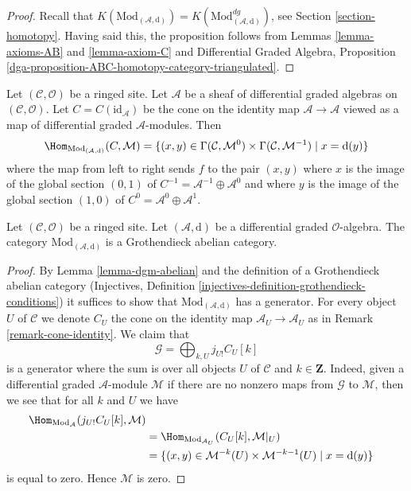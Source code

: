 \begin{proof}
Recall that $K(\text{Mod}_{(\mathcal{A}, \text{d})}) =
K(\text{Mod}^{dg}_{(\mathcal{A}, \text{d})})$, see
Section \ref{section-homotopy}.
Having said this, the proposition
follows from Lemmas \ref{lemma-axioms-AB} and \ref{lemma-axiom-C}
and
Differential Graded Algebra, Proposition
\ref{dga-proposition-ABC-homotopy-category-triangulated}.
\end{proof}

\begin{remark}
\label{remark-cone-identity}
Let $(\mathcal{C}, \mathcal{O})$ be a ringed site.
Let $\mathcal{A}$ be a sheaf of differential graded algebras
on $(\mathcal{C}, \mathcal{O})$. Let $C = C(\text{id}_\mathcal{A})$
be the cone on the identity map $\mathcal{A} \to \mathcal{A}$ viewed
as a map of differential graded $\mathcal{A}$-modules.
Then
$$
\Hom_{\text{Mod}_{(\mathcal{A}, \text{d})}}(C, \mathcal{M}) =
\{(x, y) \in
\Gamma(\mathcal{C}, \mathcal{M}^0) \times
\Gamma(\mathcal{C}, \mathcal{M}^{-1}) \mid
x = \text{d}(y)\}
$$
where the map from left to right sends $f$ to the pair $(x, y)$
where $x$ is the image of the global section $(0, 1)$ of
$C^{-1} = \mathcal{A}^{-1} \oplus \mathcal{A}^0$ and where
$y$ is the image of the global section $(1, 0)$ of
$C^0 = \mathcal{A}^0 \oplus \mathcal{A}^1$.
\end{remark}

\begin{lemma}
\label{lemma-dgm-grothendieck-abelian}
Let $(\mathcal{C}, \mathcal{O})$ be a ringed site.
Let $(\mathcal{A}, \text{d})$ be a differential graded $\mathcal{O}$-algebra.
The category $\text{Mod}_{(\mathcal{A}, \text{d})}$
is a Grothendieck abelian category.
\end{lemma}

\begin{proof}
By Lemma \ref{lemma-dgm-abelian} and the definition of a Grothendieck
abelian category
(Injectives, Definition \ref{injectives-definition-grothendieck-conditions})
it suffices to
show that $\text{Mod}_{(\mathcal{A}, \text{d})}$
has a generator. For every object $U$ of $\mathcal{C}$ we denote
$C_U$ the cone on the identity map $\mathcal{A}_U \to \mathcal{A}_U$
as in Remark \ref{remark-cone-identity}. We claim that
$$
\mathcal{G} = \bigoplus\nolimits_{k, U} j_{U!}C_U[k]
$$
is a generator where the sum is over all objects $U$ of $\mathcal{C}$
and $k \in \mathbf{Z}$. Indeed, given a
differential graded $\mathcal{A}$-module $\mathcal{M}$
if there are no nonzero maps from $\mathcal{G}$ to $\mathcal{M}$,
then we see that for all $k$ and $U$ we have
\begin{align*}
\Hom_{\text{Mod}_\mathcal{A}}(j_{U!}C_U[k], \mathcal{M}) \\
& =
\Hom_{\text{Mod}_{\mathcal{A}_U}}(C_U[k], \mathcal{M}|_U) \\
& =
\{(x, y) \in \mathcal{M}^{-k}(U) \times \mathcal{M}^{-k - 1}(U) \mid
x = \text{d}(y)\}
\end{align*}
is equal to zero. Hence $\mathcal{M}$ is zero.
\end{proof}











